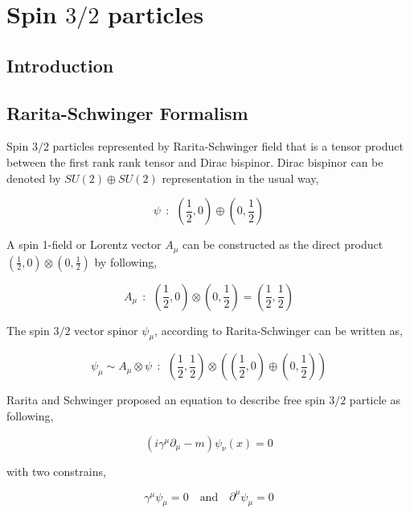 \chapter{Spin $3/2$ particles}
\label{ch:Spin3o2particles}

\section{Introduction}

\section{Rarita-Schwinger Formalism}
 
Spin $3/2$ particles represented by Rarita-Schwinger field that is a tensor product between the first rank rank tensor and Dirac bispinor. Dirac bispinor can be denoted by $SU(2)\oplus SU(2)$ representation in the usual way,

\begin{equation}
   \psi ~~ : ~~ (\frac{1}{2},0) \oplus (0,\frac{1}{2})
\end{equation}

A spin 1-field or Lorentz vector $A_{\mu}$ can be constructed as the direct product $(\frac{1}{2},0) \otimes (0,\frac{1}{2})$ by following,

\begin{equation}
   A_{\mu} ~~ : ~~ (\frac{1}{2},0) \otimes (0,\frac{1}{2})  = (\frac{1}{2},\frac{1}{2}) 
\end{equation}

The spin $3/2$ vector spinor $\psi_{\mu}$, according to Rarita-Schwinger can be written as,

\begin{equation}
   \psi_{\mu} \sim A_{\mu} \otimes \psi ~~ : ~~ (\frac{1}{2},\frac{1}{2}) \otimes \left( (\frac{1}{2},0) \oplus (0,\frac{1}{2}) \right)
\end{equation}

Rarita and Schwinger proposed an equation to describe free spin $3/2$ particle as following,

\begin{equation}
   (i\gamma^{\mu}\partial_{\mu} - m) \psi_{\nu}(x) = 0
\end{equation}

with two constrains,

\begin{equation}
   \gamma^{\mu} \psi_{\mu} = 0 \quad \text{and} \quad \partial^{\mu}\psi_{\mu} = 0 
\end{equation}

